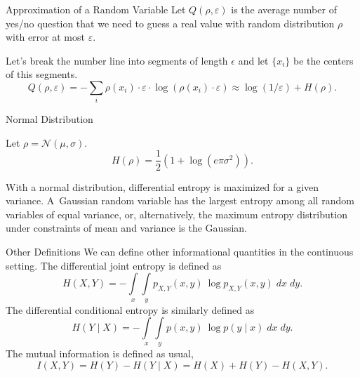 \documentclass[aspectratio=169]{beamer}
\begin{document}
\begin{frame}[fragile]{Approximation of a Random Variable}
    Let $Q(\rho, \varepsilon)$ is the average number of yes/no question that
    we need to guess a real value with random distribution $\rho$ with error at most $\varepsilon$.

    Let's break the number line into segments of length $\epsilon$ and let $\{x_i\}$ be the centers of this segments.
    \[
    Q(\rho, \varepsilon) = -\sum_i \rho(x_i)\cdot\varepsilon\cdot\log(\rho(x_i)\cdot\varepsilon) \approx \log(1/\varepsilon) + H(\rho).
    \]
\end{frame}


\begin{frame}{Normal Distribution}
    \begin{theorem}
        Let $\rho = \mathcal{N}(\mu,\sigma)$.
        \[
        H(\rho) = \frac{1}{2}(1+\log(e\pi\sigma^2)).
        \]
    \end{theorem}


    \begin{theorem}
        With a normal distribution, differential entropy is maximized for a given variance. A~Gaussian random variable has the largest entropy among all random variables of equal variance, or, alternatively, the maximum entropy distribution under constraints of mean and variance is the Gaussian.
    \end{theorem}

\end{frame}

\begin{frame}{Other Definitions}
  We can define other informational quantities in the continuous setting.
  The differential joint entropy is defined as
  \[
  H(X, Y) = - \int\limits_x\int\limits_y p_{X, Y}(x, y) \ \log p_{X, Y}(x, y) \;dx \;dy.
  \]
  The differential conditional entropy is similarly defined as
  \[
  H(Y \mid X) = - \int\limits_x \int\limits_y p(x, y) \ \log p(y \mid x) \;dx \;dy.
  \]
  The mutual information is defined as usual,
  \[
  I(X,Y) = H(Y) - H(Y \mid X) = H(X) + H(Y) - H(X,Y).
  \]

\end{frame}
\end{document}
